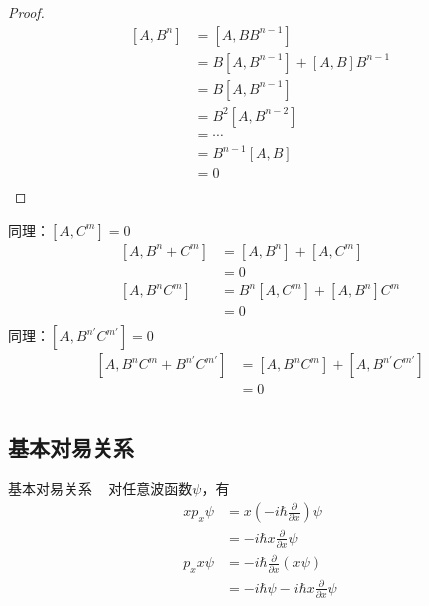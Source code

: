\begin{frame} [allowframebreaks=]
    \begin{proof}{}
        \begin{equation*}
            \begin{split} 
             [A,B^{n}]&=[A,BB^{n-1}] \\
             &=B[A,B^{n-1}]+[A,B]B^{n-1}\\
             &=B[A,B^{n-1}] \\
             &=B^2[A,B^{n-2}]\\
             &=\cdots\\
             &=B^{n-1}[A,B]\\
             &= 0\\
            \end{split}  
        \end{equation*}  
    \end{proof}
        同理：$[A,C^{m}]=0$\\
        \begin{equation*}
            \begin{split} 
            [A,B^{n}+C^{m}] &= [A,B^{n}]+[A,C^{m}]\\
            &=0 \\
            [A,B^{n}C^{m}] &= B^{n}[A,C^{m}] + [A,B^{n}] C^{m}\\
            &=0 \\
        \end{split}  
        \end{equation*}
        同理：$[A,B^{n'}C^{m'}]=0$\\
        \begin{equation*}
            \begin{split} 
            [A,B^{n}C^{m}+B^{n'}C^{m'}] &= [A,B^{n}C^{m}]+[A,B^{n'}C^{m'}]\\
            &=0\\
        \end{split}  
        \end{equation*}
\end{frame} 

\subsection{基本对易关系}

\begin{frame}{基本对易关系}
    \解~ 对任意波函数$\psi$，有
    \begin{equation*}
        \begin{split}
        xp_x\psi&= x(-i\hbar \frac{\partial}{\partial x})\psi \\
        &=-i\hbar x \frac{\partial}{\partial x}\psi\\
        p_x x \psi&= -i\hbar \frac{\partial}{\partial x} (x\psi) \\
        &=-i\hbar\psi - i\hbar x \frac{\partial}{\partial x}\psi \\
        \end{split}  
    \end{equation*}
\end{frame} 

